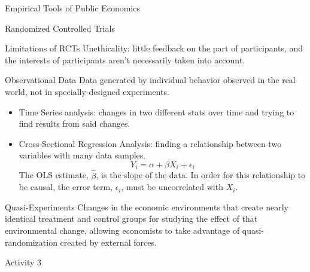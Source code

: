 \documentclass[8pt]{extarticle}
\begin{document}
\begin{problem}{Empirical Tools of Public Economics}
\begin{problem}{Randomized Controlled Trials}
\begin{problem}{Limitations of RCTs}
        Unethicality: little feedback on the part of participants, and the interests of participants aren't necessarily taken into account.
      \end{problem}
    \end{problem}
    \begin{problem}{Observational Data}
      Data generated by individual behavior observed in the real world, not in specially-designed experiments.
      \begin{itemize}
        \item Time Series analysis: changes in two different stats over time and trying to find results from said changes.
        \item Cross-Sectional Regression Analysis: finding a relationship between two variables with many data samples.
          \[
            Y_i = \alpha + \beta X_i + \epsilon_i
          \] 
          The OLS estimate, $\hat{\beta}$, is the slope of the data. In order for this relationship to be causal, the error term, $\epsilon_i$, must be uncorrelated with $X_i$.
      \end{itemize}
    \end{problem}
    \begin{problem}{Quasi-Experiments}
      Changes in the economic environments that create nearly identical treatment and control groups for studying the effect of that environmental change, allowing economists to take advantage of quasi-randomization created by external forces.
    \end{problem}
  \end{problem}
  \begin{problem}{Activity 3}
   \begin{tcbraster}[raster columns = 1,colframe = black!75!white,colback=white]
   \end{tcbraster}
  \end{problem}
\end{document}
